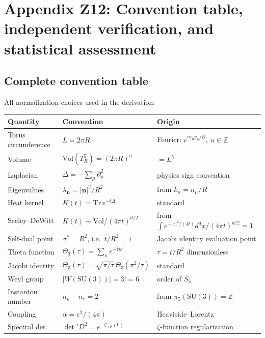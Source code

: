 
\section{Appendix Z12: Convention table, independent verification,
  and statistical assessment}
\label{app:comprehensive}

\subsection{Complete convention table}
\label{sec:conventions}

All normalization choices used in the derivation:

\begin{center}
\renewcommand{\arraystretch}{1.25}\small
\begin{tabular}{lll}
\toprule
\textbf{Quantity} & \textbf{Convention} & \textbf{Origin}\\
\midrule
Torus circumference & $L = 2\pi R$ & Fourier: $e^{in_\mu y_\mu/R}$, $n\in\mathbb{Z}$\\
Volume & $\mathrm{Vol}(T^5_R)=(2\pi R)^5$ & $=L^5$\\
Laplacian & $\Delta = -\sum_\mu\partial_\mu^2$ & physics sign convention\\
Eigenvalues & $\lambda_\mathbf{n}=|\mathbf{n}|^2/R^2$ & from $k_\mu=n_\mu/R$\\
Heat kernel & $K(t)=\mathrm{Tr}\,e^{-t\Delta}$ & standard\\
Seeley--DeWitt & $K(t)\sim\mathrm{Vol}/(4\pi t)^{d/2}$ & from $\int e^{-|x|^2/(4t)}d^dx/(4\pi t)^{d/2}=1$\\
Self-dual point & $\sigma^*=R^2$, i.e.\ $t/R^2=1$ & Jacobi identity evaluation point\\
Theta function & $\Theta_3(\tau)=\sum_n e^{-\tau n^2}$ & $\tau=t/R^2$ dimensionless\\
Jacobi identity & $\Theta_3(\tau)=\sqrt{\pi/\tau}\,\Theta_3(\pi^2/\tau)$ & standard\\
Weyl group & $|W(\mathrm{SU}(3))|=3!=6$ & order of $S_3$\\
Instanton number & $n_p-n_e=2$ & from $\pi_5(\mathrm{SU}(3))=\mathbb{Z}$\\
Coupling & $\alpha=e^2/(4\pi)$ & Heaviside--Lorentz\\
Spectral det.\ & $\det'D^2=e^{-\zeta'_{D^2}(0)}$ & $\zeta$-function regularization\\
\bottomrule
\end{tabular}
\end{center}


